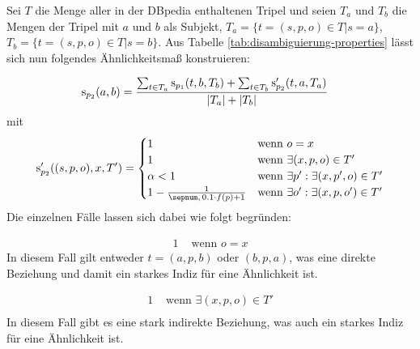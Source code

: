 \begin{figure}[H]
\centering
{}
\end{figure}

Sei $T$ die Menge aller in der DBpedia enthaltenen Tripel und seien $T_a$ und $T_b$ die Mengen der Tripel mit $a$ und $b$ als Subjekt, $T_a = \{t=(s,p,o)\in T| s = a\}$,
$T_b = \{t=(s,p,o)\in T| s = b\}$.
Aus Tabelle \ref{tab:disambiguierung-properties} lässt sich nun folgendes Ähnlichkeitsmaß konstruieren:

\begin{align}
\textnormal{s}_{p_2}(a,b)	&= \frac{\sum_{t \in T_a} \textnormal{s}_{p_1}(t,b,T_b)+\sum_{t \in T_b} \textnormal{s}_{p_2}'(t,a,T_a)}{|T_a|+|T_b|}
\end{align}
mit
\begin{equation}
\s_{p_2}'((s,p,o),x,T') = 
\begin{cases}
1 					&\text{wenn } o=x\\
1 					&\text{wenn } \exists (x,p,o) \in T'\\
\alpha<1				&\text{wenn } \exists p': 	\exists (x,p',o) \in T'\\
1-\frac{1}{\val{0.1}\cdot f(p)+1}	&\text{wenn } \exists o':	\exists (x,p,o') \in T'\\
\end{cases} 
\end{equation}
Die einzelnen Fälle lassen sich dabei wie folgt begründen:

\begin{align*}
1 			&\text{  wenn } o=x
\end{align*}
In diesem Fall gilt entweder $t = (a,p,b)$ oder $(b,p,a)$, was eine direkte Beziehung und damit ein starkes Indiz für eine Ähnlichkeit ist.

\begin{align*}
1 			&\text{  wenn } \exists (x,p,o) \in T'\\
\end{align*}
In diesem Fall gibt es eine stark indirekte Beziehung, was auch ein starkes Indiz für eine Ähnlichkeit ist.

